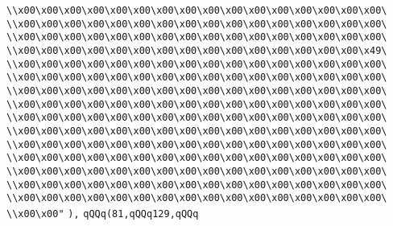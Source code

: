 \verb|\\x00\x00\x00\x00\x00\x00\x00\x00\x00\x00\x00\x00\x00\x00\x00\x00\|\newline
\verb|\\x00\x00\x00\x00\x00\x00\x00\x00\x00\x00\x00\x00\x00\x00\x00\x00\|\newline
\verb|\\x00\x00\x00\x00\x00\x00\x00\x00\x00\x00\x00\x00\x00\x00\x00\x00\|\newline
\verb|\\x00\x00\x00\x00\x00\x00\x00\x00\x00\x00\x00\x00\x00\x00\x00\x49\|\newline
\verb|\\x00\x00\x00\x00\x00\x00\x00\x00\x00\x00\x00\x00\x00\x00\x00\x00\|\newline
\verb|\\x00\x00\x00\x00\x00\x00\x00\x00\x00\x00\x00\x00\x00\x00\x00\x00\|\newline
\verb|\\x00\x00\x00\x00\x00\x00\x00\x00\x00\x00\x00\x00\x00\x00\x00\x00\|\newline
\verb|\\x00\x00\x00\x00\x00\x00\x00\x00\x00\x00\x00\x00\x00\x00\x00\x00\|\newline
\verb|\\x00\x00\x00\x00\x00\x00\x00\x00\x00\x00\x00\x00\x00\x00\x00\x00\|\newline
\verb|\\x00\x00\x00\x00\x00\x00\x00\x00\x00\x00\x00\x00\x00\x00\x00\x00\|\newline
\verb|\\x00\x00\x00\x00\x00\x00\x00\x00\x00\x00\x00\x00\x00\x00\x00\x00\|\newline
\verb|\\x00\x00\x00\x00\x00\x00\x00\x00\x00\x00\x00\x00\x00\x00\x00\x00\|\newline
\verb|\\x00\x00\x00\x00\x00\x00\x00\x00\x00\x00\x00\x00\x00\x00\x00\x00\|\newline
\verb|\\x00\x00\x00\x00\x00\x00\x00\x00\x00\x00\x00\x00\x00\x00\x00\x00\|\newline
\verb|\\x00\x00\x00\x00\x00\x00\x00\x00\x00\x00\x00\x00\x00\x00\x00\x00\|\newline
\verb|\\x00\x00"|\newline
\verb|),|\newline
\verb|qQQq(81,qQQq129,qQQq|\newline
